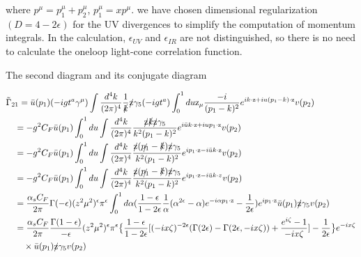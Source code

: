\documentclass{article}
\begin{document}
  
where $p^\mu=p_1^\mu+p_2^\mu$, $p_1^\mu=xp^\mu$. we have chosen dimensional regularization $(D = 4 -2 \epsilon )$ for the UV divergences to simplify
the computation of momentum integrals. In the calculation, $\epsilon_{UV}$ and $\epsilon_{IR}$ are not distinguished, so there is no need to calculate the oneloop light-cone correlation function.
    
    \phantom{}
    
The second diagram and its conjugate diagram 
    
      
  \begin{align}{}
 	&\tilde{\Gamma}_{21}=\bar{u}(p_1)(-igt^a\gamma^\mu) \int \frac{d^4 k}{(2\pi)^4} \frac{1}{\slashed{k}} \slashed{\text{z}} \gamma_5 (-i g t^a)\int_{0}^{1} du \text{z}_\mu \frac{-i}{(p_1-k)^2}e^{ik\cdot \text{z}+ iu (p_1-k)\cdot \text{z}}v(p_2)\notag\\
 	& \quad =-g^2 C_F \bar{u}(p_1) \int_{0}^{1} du \int \frac{d^4 k}{(2\pi)^4} \frac{\slashed{\text{z}}\slashed{k}\slashed{\text{z}} \gamma_5}{k^2(p_1-k)^2}e^{i\bar{u} k\cdot\text{z}+ i u p_1 \cdot \text{z}}v(p_2)\notag\\
 	& \quad =-g^2 C_F \bar{u}(p_1)\int_{0}^{1} du \int \frac{d^4 k}{(2\pi)^4} \frac{\slashed{\text{z}}(\slashed{p_1}-\slashed{k})\slashed{\text{z}} \gamma_5}{k^2(p_1-k)^2}e^{ip_1\cdot \text{z}-i\bar{u}k\cdot\text{z}}v(p_2)\notag\\	
 	& \quad =-g^2 C_F \bar{u}(p_1)\int_{0}^{1} du \int \frac{d^4 k}{(2\pi)^4} \frac{\slashed{\text{z}}(\slashed{p_1}-\slashed{k})\slashed{\text{z}} \gamma_5}{k^2(p_1-k)^2}e^{ip_1\cdot \text{z}-i\bar{u}k\cdot z}v(p_2)\notag\\	
    & \quad =\frac{\alpha_s C_F}{2\pi} \Gamma(-\epsilon)(z^2\mu^2)^\epsilon \pi^\epsilon \int_{0}^{1}d\alpha (\frac{1-\epsilon}{1-2\epsilon}\frac{1}{\alpha} (\alpha^{2\epsilon}-\alpha)e^{-i \alpha p_1 \cdot \text{z}}-\frac{1}{2\epsilon})e^{i p_1 \cdot \text{z}} \bar{u}(p_1) \slashed{\text{z}} \gamma_5 v(p_2)\notag\\		
    & \quad =\frac{\alpha_s C_F}{2\pi} \frac{\Gamma(1-\epsilon)}{-\epsilon} (z^2\mu^2)^\epsilon \pi^\epsilon \big\{\frac{1-\epsilon}{1-2\epsilon}[(-i x\zeta)^{-2\epsilon}(\Gamma(2\epsilon)-\Gamma(2\epsilon,-i x\zeta))+\frac{e^{i \zeta}-1}{-ix\zeta}]-\frac{1}{2\epsilon}\big\}e^{-ix\zeta}\notag\\
    &\qquad \times \bar{u}(p_1) \slashed{\text{z}} \gamma_5 v(p_2)\notag\\	
   \end{align}
\end{document}
